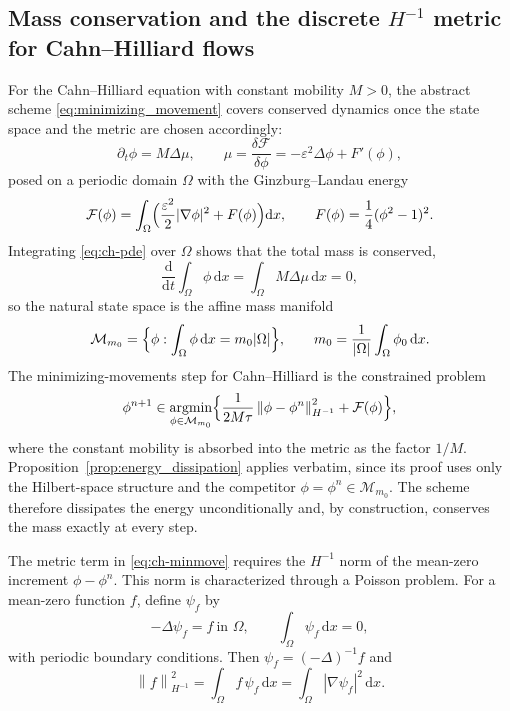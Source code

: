 \documentclass[11pt,letterpaper]{article}
\theoremstyle{plain}
\theoremstyle{definition}
\newcommand{\phn}{\phi^n}
\newcommand{\grad}{\nabla}%
\newcommand{\norm}[1]{\left\| #1 \right\|}
\newcommand{\E}{\mathcal{F}}
\newcommand{\argmin}{\mathop{\mathrm{argmin}}}
\newcommand{\dd}{\mathrm{d}}
\begin{document}
\subsection{Mass conservation and the discrete \texorpdfstring{$H^{-1}$}{H-1} metric for Cahn--Hilliard flows}
\label{subsec:ch-metric}

For the Cahn--Hilliard equation with constant mobility $M>0$, the abstract scheme \eqref{eq:minimizing_movement} covers conserved dynamics once the state space and the metric are chosen accordingly:
\begin{equation}
\partial_t \phi = M\Delta\mu,
\qquad
\mu = \frac{\delta \E}{\delta \phi} = -\varepsilon^2\Delta\phi + F'(\phi),
\label{eq:ch-pde}
\end{equation}
posed on a periodic domain $\Omega$ with the Ginzburg--Landau energy
\begin{equation}
\E(\phi)=\int_\Omega \Bigl(\frac{\varepsilon^2}{2}|\grad\phi|^2 + F(\phi)\Bigr)\dd x,
\qquad
F(\phi)=\frac14(\phi^2-1)^2 .
\label{eq:ch-energy}
\end{equation}
Integrating \eqref{eq:ch-pde} over $\Omega$ shows that the total mass is conserved,
\begin{equation}
\frac{\dd}{\dd t}\int_\Omega \phi\,\dd x = \int_\Omega M\Delta\mu\,\dd x = 0,
\end{equation}
so the natural state space is the affine mass manifold
\begin{equation}
\mathcal{M}_{m_0} = \Bigl\{\phi : \int_\Omega \phi\,\dd x = m_0|\Omega|\Bigr\},
\qquad
m_0 = \frac{1}{|\Omega|}\int_\Omega \phi_0\,\dd x .
\end{equation}
The minimizing-movements step for Cahn--Hilliard is the constrained problem
\begin{equation}
\phi^{n+1}\in\argmin_{\phi\in\mathcal{M}_{m_0}}
\Bigl\{\frac{1}{2M\tau}\norm{\phi-\phi^n}_{H^{-1}}^2 + \E(\phi)\Bigr\},
\label{eq:ch-minmove}
\end{equation}
where the constant mobility is absorbed into the metric as the factor $1/M$. Proposition~\ref{prop:energy_dissipation} applies verbatim, since its proof uses only the Hilbert-space structure and the competitor $\phi=\phi^n\in\mathcal{M}_{m_0}$. The scheme therefore dissipates the energy unconditionally and, by construction, conserves the mass exactly at every step.

The metric term in \eqref{eq:ch-minmove} requires the $H^{-1}$ norm of the mean-zero increment $\phi-\phn$. This norm is characterized through a Poisson problem. For a mean-zero function $f$, define $\psi_f$ by
\begin{equation}
-\Delta\psi_f = f \ \text{in } \Omega,
\qquad
\int_\Omega \psi_f\,\dd x = 0,
\end{equation}
with periodic boundary conditions. Then $\psi_f=(-\Delta)^{-1}f$ and
\begin{equation}
\norm{f}_{H^{-1}}^2
= \int_\Omega f\,\psi_f\,\dd x
= \int_\Omega |\grad\psi_f|^2\,\dd x .
\end{equation}
\end{document}
